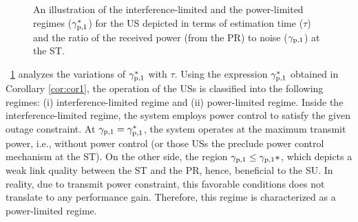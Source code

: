 \begin{figure}[!ht]

\caption{An illustration of the interference-limited and the power-limited regimes (${\gamma}_{\text{p,1}}^*$) for the US depicted in terms of estimation time ($\tau$) and the ratio of the received power (from the PR) to noise (${\gamma}_{\text{p,1}}$) at the ST.}
\label{fig:or}
\end{figure}
\begin{remark} \label{rm:rm1}
\normalfont
\figurename~\ref{fig:or} analyzes the variations of ${\gamma}_{\text{p,1}}^*$ with $\tau$. Using the expression ${\gamma}_{\text{p,1}}^*$ obtained in Corollary \ref{cor:cor1}, the operation of the USs is classified into the following regimes: (i) interference-limited regime and (ii) power-limited regime. Inside the interference-limited regime, the system employs power control to satisfy the given outage constraint. At ${\gamma}_{\text{p,1}} = {\gamma}_{\text{p,1}}^*$, the system operates at the maximum transmit power, i.e., without power control (or those USs the preclude power control mechanism at the ST). On the other side, the region ${\gamma}_{\text{p,1}} \le {\gamma}_{\text{p,1}}*$, which depicts a weak link quality between the ST and the PR, hence, beneficial to the SU. In reality, due to transmit power constraint, this favorable conditions does not translate to any performance gain. Therefore, this regime is characterized as a power-limited regime. %
\end{remark}

